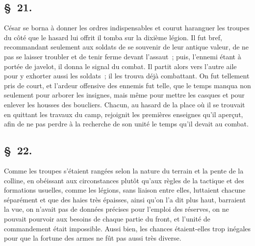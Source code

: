 \documentclass[french,twoside]{book} %
\begin{document}
\subsection[{§ 21.}]{ \textsc{§ 21.} }
\noindent César se borna à donner les ordres indispensables et courut haranguer les troupes du côté que le hasard lui offrit il tomba sur la dixième légion. Il fut bref, recommandant seulement aux soldats de se souvenir de leur antique valeur, de ne pas se laisser troubler et de tenir ferme devant l’assaut ; puis, l’ennemi étant à portée de javelot, il donna le signal du combat. Il partit alors vers l’autre aile pour y exhorter aussi les soldats ; il les trouva déjà combattant. On fut tellement pris de court, et l’ardeur offensive des ennemis fut telle, que le temps manqua non seulement pour arborer les insignes, mais même pour mettre les casques et pour enlever les housses des boucliers. Chacun, au hasard de la place où il se trouvait en quittant les travaux du camp, rejoignit les premières enseignes qu’il aperçut, afin de ne pas perdre à la recherche de son unité le temps qu’il devait au combat.
\subsection[{§ 22.}]{ \textsc{§ 22.} }
\noindent Comme les troupes s’étaient rangées selon la nature du terrain et la pente de la colline, en obéissant aux circonstances plutôt qu’aux règles de la tactique et des formations usuelles, comme les légions, sans liaison entre elles, luttaient chacune séparément et que des haies très épaisses, ainsi qu’on l’a dit plus haut, barraient la vue, on n’avait pas de données précises pour l’emploi des réserves, on ne pouvait pourvoir aux besoins de chaque partie du front, et l’unité de commandement était impossible. Aussi bien, les chances étaient-elles trop inégales pour que la fortune des armes ne fût pas aussi très diverse.
\end{document}
